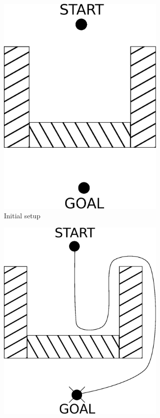 \documentclass[english,a4paper,twoside]{ppfcmthesis}
\begin{document}
\begin{figure}
  \centering
  \begin{subfigure}{0.33\textwidth}
    \centering
    \includegraphics[width=0.9\textwidth]{background/physarum/trap_initial.eps}
    \caption{Initial setup}
    \label{figure:bp_trap_model}
  \end{subfigure}
  \begin{subfigure}{0.37\textwidth}
    \centering
    \includegraphics[width=0.9\textwidth]{background/physarum/trap_success.eps}

\end{subfigure}
\end{figure}
\end{document}

